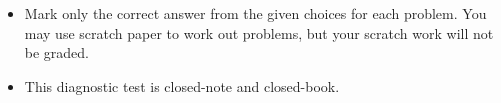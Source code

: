 \documentclass[12pt]{exam}
\begin{document}
\begin{center}
\end{center}
\vspace{0.1in}

\vspace{12pt}

\begin{itemize}
  \item Mark only the correct answer from the given choices for each problem.
        You may use scratch paper to work out problems, but your scratch work
        will not be graded.
  \item This diagnostic test is closed-note and closed-book.
\end{itemize}

\newpage
\end{document}
